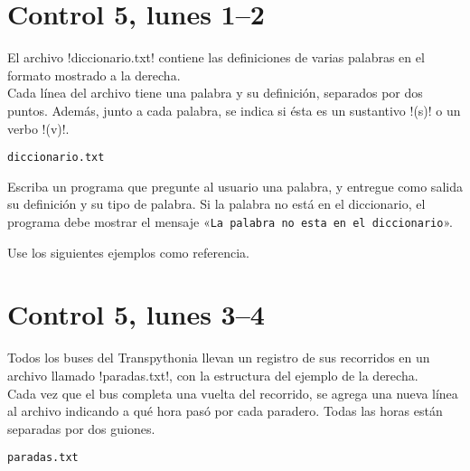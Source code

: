 \documentclass[12pt,spanish,a5paper,landscape]{article}
\begin{document}
  \pagestyle{empty}
  \thispagestyle{empty}

  \part*{Control 5, lunes 1--2}
  \newpage

  \begin{minipage}[t]{0.45\textwidth}
    El archivo \li!diccionario.txt!
    contiene las definiciones de varias palabras
    en el formato mostrado a la derecha.
    \\[2ex]
    Cada línea del archivo tiene una palabra y su definición,
    separados por dos puntos.
    Además, junto a cada palabra,
    se indica si ésta es un sustantivo \li!(s)!
    o un verbo \li!(v)!.
  \end{minipage}
  \hfill
  \begin{minipage}[t]{0.45\textwidth}
    \hfil\verb!diccionario.txt!\hfil
    \small
    
  \end{minipage}

  Escriba un programa que pregunte al usuario una palabra,
  y entregue como salida su definición y su tipo de palabra.
  Si la palabra no está en el diccionario,
  el programa debe mostrar el mensaje
  «\texttt{La palabra no esta en el diccionario}».

  Use los siguientes ejemplos como referencia.

  \begin{minipage}[t]{0.6\textwidth}
    
  \end{minipage}

  \begin{minipage}[t]{0.6\textwidth}
    
  \end{minipage}

  \newpage

  \part*{Control 5, lunes 3--4}
  \newpage

  \begin{minipage}[t]{0.45\textwidth}
    Todos los buses del Transpythonia
    llevan un registro de sus recorridos
    en un archivo llamado \li!paradas.txt!,
    con la estructura del ejemplo de la derecha.
    \\[2ex]
    Cada vez que el bus completa una vuelta del recorrido,
    se agrega una nueva línea al archivo
    indicando a qué hora pasó por cada paradero.
    Todas las horas están separadas por dos guiones.
  \end{minipage}
  \hfill
  \begin{minipage}[t]{0.45\textwidth}
    \hfil\verb!paradas.txt!\hfil
    \small
    
  \end{minipage}
\end{document}
